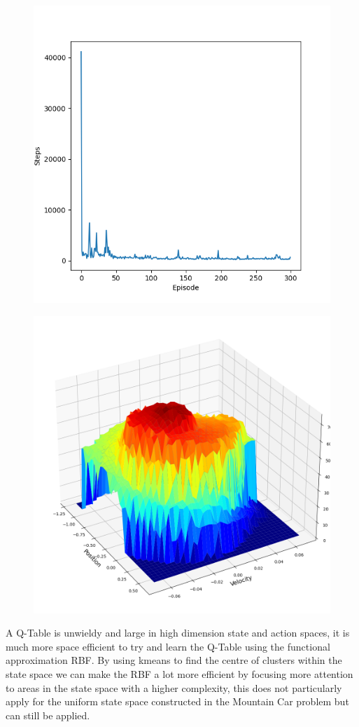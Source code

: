 \documentclass[sigconf]{acmart}
\begin{document}
\begin{figure}
  \begin{minipage}{.5\textwidth}
    \centering
    \includegraphics[width=.6\linewidth]{../MCar/STEPS.png}
    \label{fig:STEPS}
  \end{minipage}%
  \begin{minipage}{.5\textwidth}
    \centering
    \includegraphics[width=.6\linewidth]{../MCar/1000 Episode.png}
    \label{fig:1KEpisode}
  \end{minipage}
\end{figure}
A Q-Table is unwieldy and large in high dimension state and action spaces, it is much more space efficient to try and learn the Q-Table using the functional approximation RBF. 
By using kmeans to find the centre of clusters within the state space we can make the RBF a lot more efficient by focusing more attention to areas in the state space with a higher complexity, 
this does not particularly apply for the uniform state space constructed in the Mountain Car problem but can still be applied.
\end{document}
